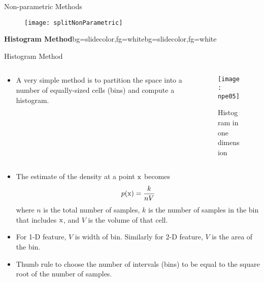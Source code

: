 \begin{frame}{Non-parametric Methods}
\begin{figure}
\texttt{[image: splitNonParametric]}
\end{figure}
\end{frame}

\begin{frame}{}
\begin{variableblock}{\centering \Large \textbf{\vspace{4pt}\newline Histogram Method\vspace{4pt}}}{bg=slidecolor,fg=white}{bg=slidecolor,fg=white}
\end{variableblock}
\end{frame}


\begin{frame}{Histogram Method}
\vspace{-0.5cm}
\begin{columns}
\begin{column}{5cm}
\begin{footnotesize}
\begin{itemize}
\item A very simple method is to
partition the space into a
number of equally-sized
cells (bins) and compute a
histogram.
\end{itemize}
\end{footnotesize}
\end{column}
\begin{column}{5cm}
\begin{figure}
\texttt{[image: npe05]}
\caption{Histogram in one dimension}
\end{figure}
\end{column}
\end{columns}
\begin{footnotesize}
\begin{itemize}
\item The estimate of the density at a point ${\rm x}$ becomes
\begin{equation}
p({\rm x})=\frac{k}{nV} \nonumber
\end{equation}
where $n$ is the total number of samples, $k$ is the number of samples in the bin that includes ${\rm x}$, and $V$ is the volume of that cell.
\item For 1-D feature, $V$ is width of bin. Similarly for 2-D feature, $V$ is the area of the bin.
\item Thumb rule to choose the number of intervals (bins) to be equal to the square root of the number of samples.
\end{itemize}
\end{footnotesize}
\end{frame}

